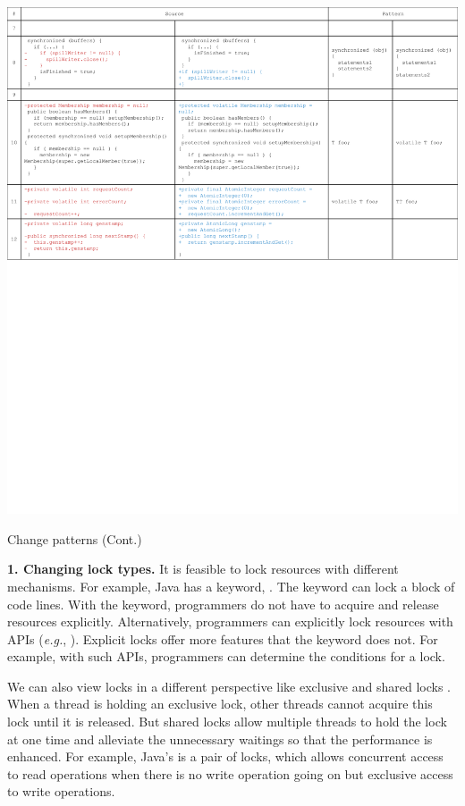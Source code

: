 \begin{table}
	\centering
	\includegraphics[width=1\textwidth]{patterns2}
	\caption{Change patterns (Cont.)}
	\label{table:patterns2}
\end{table}
\noindent
\textbf{1. Changing lock types.} It is feasible to lock resources with different mechanisms. For example, Java has a keyword, . The keyword can lock a block of code lines. With the keyword, programmers do not have to acquire and release resources explicitly. Alternatively, programmers can explicitly lock resources with APIs (\emph{e.g.}, ). Explicit locks offer more features that the  keyword does not. For example, with such APIs, programmers can determine the conditions for a lock.

We can also view locks in a different perspective like exclusive and shared locks \cite{journals/jacm/KedemS83}. When a thread is holding an exclusive lock, other threads cannot acquire this lock until it is released. But shared locks allow multiple threads to hold the lock at one time and alleviate the unnecessary waitings so that the performance is enhanced. For example, Java's  is a pair of locks, which allows concurrent access to read operations when there is no write operation going on but exclusive access to write operations.%

